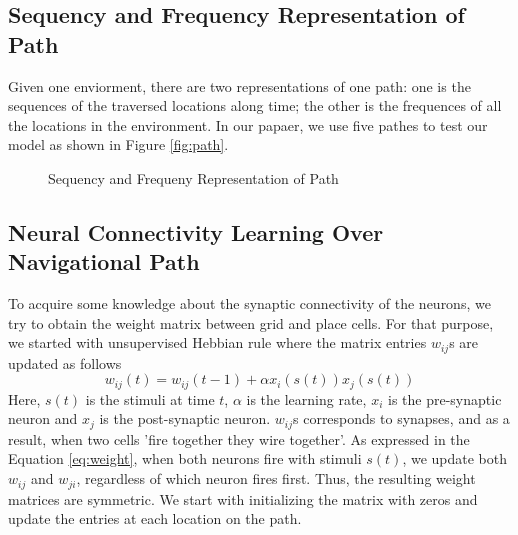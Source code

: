 \documentclass[11pt, letterpaper, onecolumn]{article}
\begin{document}
\subsection{Sequency and Frequency Representation of Path}
Given one enviorment, there are two representations of one path: one is the sequences of the traversed locations along time; the other is the frequences of all the locations in the environment. In our papaer, we use five pathes to test our model as shown in Figure \ref{fig:path}.

\begin{figure}
\hfill
{}
\hfill
{}
\hfill
{}
\hfill
{}
\hfill
\caption{Sequency and Frequeny Representation of Path}
\end{figure}

\subsection{Neural Connectivity Learning Over Navigational Path}

To acquire some knowledge about the synaptic connectivity of the neurons, we try to obtain the weight matrix between grid and place cells. For that purpose, we started with unsupervised Hebbian rule where the matrix entries $ w_{ij} $s are updated as follows
\begin{equation}
\label{eq:weight}
w_{ij}(t) = w_{ij}(t-1) + \alpha x_{i}(s(t)) x_{j}(s(t))
\end{equation}
Here, $ s(t) $ is the stimuli at time $ t $, $ \alpha $ is the learning rate, $ x_{i} $ is the pre-synaptic neuron and $ x_{j} $ is the post-synaptic neuron. $ w_{ij} $s corresponds to synapses, and as a result, when two cells 'fire together they wire together'. As expressed in the Equation \ref{eq:weight}, when both neurons fire with stimuli $ s(t) $, we update both $ w_{ij} $ and $ w_{ji} $, regardless of which neuron fires first. Thus, the resulting weight matrices are symmetric. We start with initializing the matrix with zeros and update the entries at each location on the path.
\end{document}
